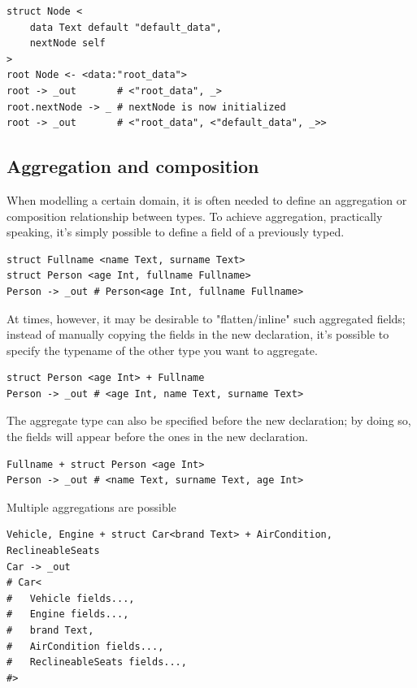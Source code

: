 \begin{verbatim}
struct Node <
	data Text default "default_data",
	nextNode self
>
root Node <- <data:"root_data">
root -> _out       # <"root_data", _>
root.nextNode -> _ # nextNode is now initialized
root -> _out       # <"root_data", <"default_data", _>>
\end{verbatim}

\clearpage

\subsection{Aggregation and composition}

When modelling a certain domain, it is often needed to define an aggregation or
composition relationship between types. To achieve aggregation, practically
speaking, it's simply possible to define a field of a previously typed.

\begin{verbatim}
struct Fullname <name Text, surname Text>
struct Person <age Int, fullname Fullname>
Person -> _out # Person<age Int, fullname Fullname>
\end{verbatim}

At times, however, it may be desirable to "flatten/inline" such aggregated
fields; instead of manually copying the fields in the new declaration, it's
possible to specify the typename of the other type you want to aggregate.

\begin{verbatim}
struct Person <age Int> + Fullname
Person -> _out # <age Int, name Text, surname Text>
\end{verbatim}

The aggregate type can also be specified before the new declaration; by doing
so, the fields will appear before the ones in the new declaration.

\begin{verbatim}
Fullname + struct Person <age Int>
Person -> _out # <name Text, surname Text, age Int>
\end{verbatim}

Multiple aggregations are possible

\begin{verbatim}
Vehicle, Engine + struct Car<brand Text> + AirCondition, ReclineableSeats
Car -> _out
# Car<
#	Vehicle fields...,
#	Engine fields...,
#	brand Text,
#	AirCondition fields...,
#	ReclineableSeats fields...,
#>
\end{verbatim}


